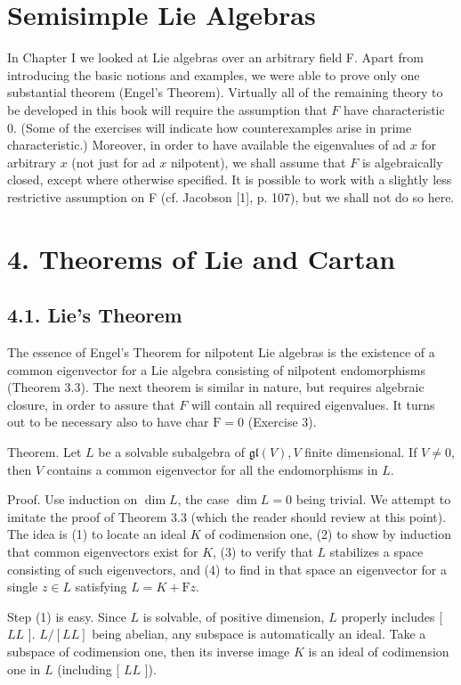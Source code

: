 \documentclass[10pt]{article}
\begin{document}
\section*{Semisimple Lie Algebras}
In Chapter I we looked at Lie algebras over an arbitrary field F. Apart from introducing the basic notions and examples, we were able to prove only one substantial theorem (Engel's Theorem). Virtually all of the remaining theory to be developed in this book will require the assumption that $F$ have characteristic 0. (Some of the exercises will indicate how counterexamples arise in prime characteristic.) Moreover, in order to have available the eigenvalues of ad $x$ for arbitrary $x$ (not just for ad $x$ nilpotent), we shall assume that $F$ is algebraically closed, except where otherwise specified. It is possible to work with a slightly less restrictive assumption on F (cf. Jacobson [1], p. 107), but we shall not do so here.

\section*{4. Theorems of Lie and Cartan}
\subsection*{4.1. Lie's Theorem}
The essence of Engel's Theorem for nilpotent Lie algebras is the existence of a common eigenvector for a Lie algebra consisting of nilpotent endomorphisms (Theorem 3.3). The next theorem is similar in nature, but requires algebraic closure, in order to assure that $F$ will contain all required eigenvalues. It turns out to be necessary also to have char $\mathrm{F}=0$ (Exercise 3).

Theorem. Let $L$ be a solvable subalgebra of $\mathfrak{g l}(V), V$ finite dimensional. If $V \neq 0$, then $V$ contains a common eigenvector for all the endomorphisms in $L$.

Proof. Use induction on $\operatorname{dim} L$, the case $\operatorname{dim} L=0$ being trivial. We attempt to imitate the proof of Theorem 3.3 (which the reader should review at this point). The idea is (1) to locate an ideal $K$ of codimension one, (2) to show by induction that common eigenvectors exist for $K$, (3) to verify that $L$ stabilizes a space consisting of such eigenvectors, and (4) to find in that space an eigenvector for a single $z \in L$ satisfying $L=K+\mathrm{F} z$.

Step (1) is easy. Since $L$ is solvable, of positive dimension, $L$ properly includes [ $L L$ ]. $L /[L L]$ being abelian, any subspace is automatically an ideal. Take a subspace of codimension one, then its inverse image $K$ is an ideal of codimension one in $L$ (including [ $L L$ ]).
\end{document}
